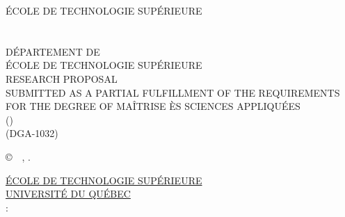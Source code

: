 \documentclass[letterpaper,12pt,oneside,final]{book}
\newcommand\monDipl{Maîtrise ès sciences appliquées}
\newcommand\monDipl{Philosophi\ae{} Doctor}
\begin{document}
\frontmatter
\thispagestyle{empty}%
\begin{center}%
ÉCOLE DE TECHNOLOGIE SUPÉRIEURE \\
\MakeUppercase{\monTitre}\\
\MakeUppercase{\monPrenom~\monNom}\\
DÉPARTEMENT DE \MakeUppercase{\monDepartement}\\
ÉCOLE DE TECHNOLOGIE SUPÉRIEURE\\
 RESEARCH PROPOSAL\\  SUBMITTED AS A PARTIAL FULFILLMENT OF THE REQUIREMENTS\\ FOR THE DEGREE OF \MakeUppercase{\monDipl}\\
(\MakeUppercase{\maDiscipline})\\
(DGA-1032)\\
\MakeUppercase{\moisDepot} \anneeDepot
\end{center}%
\copyright~\monPrenom~\monNom, \anneeDepot.
\newpage\thispagestyle{empty}%
\begin{center}%
\ul{ÉCOLE DE TECHNOLOGIE SUPÉRIEURE}\\
\ul{UNIVERSITÉ DU QUÉBEC}\\
:\\
\MakeUppercase{\monTitre}\\
\end{center}%
\end{document}
